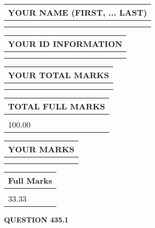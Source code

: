 \documentclass{ctexart}
\begin{document}
   
   
   
\newpage 
\setcounter{page}{ 
   435001 } 
   
   
   
   
\noindent\begin{tabular}{|l|}
\hline
YOUR NAME (FIRST, ... LAST)  \\
\hline
 \\ 
 \\ 
\hline
\end{tabular}
\hspace{0.05in} \begin{tabular}{|l|}
\hline
 YOUR   ID   INFORMATION  \\
\hline
 \\ 
 \\ 
\hline
\end{tabular}
   
   
\vspace{0.2in}\noindent\begin{tabular}{|l|}
\hline
YOUR TOTAL MARKS  \\
\hline
 \\ 
 \\ 
\hline
\end{tabular}
\hspace{0.05in} \begin{tabular}{|l|}
\hline
TOTAL FULL MARKS  \\
\hline
 \\ 
100.00 \\
\hline
\end{tabular}
   
   
 \vspace{0.2in}
 
 
 
 
   
   
  
\vspace{0.2in}
  
\noindent\begin{tabular}{|l|}
\hline
 YOUR MARKS  \\
\hline
 \\ 
 \\ 
\hline
\end{tabular}
\hspace{0.05in} \begin{tabular}{|l|}
\hline
 Full Marks  \\
\hline
 \\ 
33.33 \\
\hline
\end{tabular}
{\textbf{\Large{QUESTION
435.1 
}}}
  
\end{document}
